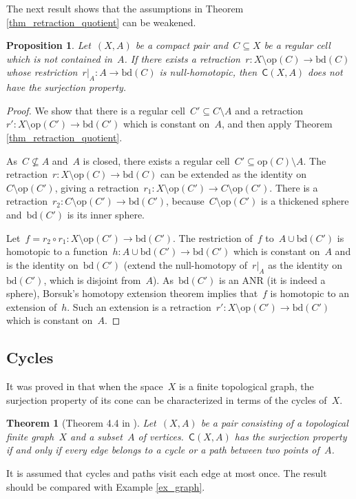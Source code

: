 \documentclass[english,11pt]{article}
\theoremstyle{plain}
\newtheorem{theorem}{Theorem}[section]
\newtheorem{proposition}{Proposition}[section]
\theoremstyle{remark}
\theoremstyle{definition}
\newcommand{\bd}[1]{\mathrm{bd}(#1)}
\newcommand{\op}[1]{\mathrm{op}(#1)}
\newcommand{\C}[1]{\mathsf{C}(#1)}%
\begin{document}
The next result shows that the assumptions in Theorem \ref{thm_retraction_quotient} can be weakened.
\begin{proposition}
Let~$(X,A)$ be a compact pair and~$C\subseteq X$ be a regular cell which is not contained in~$A$. If there exists a retraction~$r:X\setminus \op{C}\to\bd C$ whose restriction~$r|_A:A\to\bd C$ is null-homotopic, then~$\C{X,A}$ does not have the surjection property.
\end{proposition}
\begin{proof}
We show that there is a regular cell~$C'\subseteq C\setminus A$ and a retraction~$r':X\setminus \op{C'}\to\bd{C'}$ which is constant on~$A$, and then apply Theorem \ref{thm_retraction_quotient}.

As~$C\nsubseteq A$ and~$A$ is closed, there exists a regular cell~$C'\subseteq \op{C}\setminus A$. The retraction~$r:X\setminus \op{C}\to\bd{C}$ can be extended as the identity on~$C\setminus \op{C'}$, giving a retraction~$r_1:X\setminus \op{C'}\to C\setminus \op{C'}$. There is a retraction~$r_2:C\setminus \op{C'}\to\bd{C'}$, because~$C\setminus \op{C'}$ is a thickened sphere and~$\bd{C'}$ is its inner sphere.

Let~$f=r_2\circ r_1:X\setminus \op{C'}\to\bd{C'}$. The restriction of~$f$ to~$A\cup\bd{C'}$ is homotopic to a function~$h:A\cup\bd{C'}\to\bd{C'}$ which is constant on~$A$ and is the identity on~$\bd{C'}$ (extend the null-homotopy of~$r|_A$ as the identity on~$\bd{C'}$, which is disjoint from~$A$). As~$\bd{C'}$ is an ANR (it is indeed a sphere), Borsuk's homotopy extension theorem implies that~$f$ is homotopic to an extension of~$h$. Such an extension is a retraction~$r':X\setminus \op{C'}\to\bd{C'}$ which is constant on~$A$.
\end{proof}


\subsection{Cycles}
It was proved in \cite{AH22} that when the space~$X$ is a finite topological graph, the surjection property of its cone can be characterized in terms of the cycles of~$X$.
\begin{theorem}[Theorem 4.4 in \cite{AH22}]\label{thm_graph}
Let~$(X,A)$ be a pair consisting of a topological finite graph~$X$ and a subset~$A$ of vertices.~$\C{X,A}$ has the surjection property if and only if every edge belongs to a cycle or a path between two points of~$A$.
\end{theorem}
It is assumed that cycles and paths visit each edge at most once. The result should be compared with Example \ref{ex_graph}.
\end{document}
